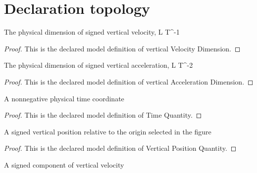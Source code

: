 \section{Declaration topology}
\begin{definition}
  \label{def:physics:phyx-mini-0795:phyxminiproblems-problemphyxmini0795-verticalvelocitydimension}
  The physical dimension of signed vertical velocity, L T\textasciicircum{}-1
\end{definition}
\begin{proof}
  This is the declared model definition of vertical Velocity Dimension.
\end{proof}
\begin{definition}
  \label{def:physics:phyx-mini-0795:phyxminiproblems-problemphyxmini0795-verticalaccelerationdimension}
  The physical dimension of signed vertical acceleration, L T\textasciicircum{}-2
\end{definition}
\begin{proof}
  This is the declared model definition of vertical Acceleration Dimension.
\end{proof}
\begin{definition}
  \label{def:physics:phyx-mini-0795:phyxminiproblems-problemphyxmini0795-timequantity}
  A nonnegative physical time coordinate
\end{definition}
\begin{proof}
  This is the declared model definition of Time Quantity.
\end{proof}
\begin{definition}
  \label{def:physics:phyx-mini-0795:phyxminiproblems-problemphyxmini0795-verticalpositionquantity}
  A signed vertical position relative to the origin selected in the figure
\end{definition}
\begin{proof}
  This is the declared model definition of Vertical Position Quantity.
\end{proof}
\begin{definition}
  \label{def:physics:phyx-mini-0795:phyxminiproblems-problemphyxmini0795-verticalvelocityquantity}
  A signed component of vertical velocity
\end{definition}

